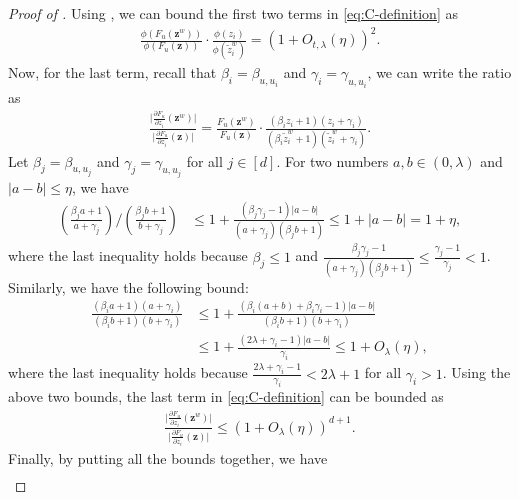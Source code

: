 \documentclass[11pt]{amsart}
\newcommand{\tp}[1]{{\left( #1 \right)}}
\theoremstyle{definition}
\theoremstyle{remark}
\begin{document}
\begin{proof}[Proof of ]
Using , we can bound the first two terms in \eqref{eq:C-definition} as
\begin{align*}
    \frac{\phi(F_u(\boldsymbol{z}^w))}{\phi(F_u(\boldsymbol{z}))} \cdot \frac{\phi(z_i)}{\phi(\tilde{z}_i^w)}  = \tp{1 + O_{t,\lambda} (\eta)}^2.
\end{align*}
Now, for the last term, recall that $\beta_i = \beta_{u,u_i}$ and $\gamma_i = \gamma_{u,u_i}$, we can write the ratio as 
\begin{align*}
    \frac{\bigl| \frac{\partial F_u}{\partial z_i}(\boldsymbol{z}^w) \bigr|}{\bigl| \frac{\partial F_u}{\partial z_i}(\boldsymbol{z}) \bigr|} = \frac{F_u(\boldsymbol{z}^w)}{F_u(\boldsymbol{z})} \cdot \frac{(\beta_i z_i + 1)(z_i + \gamma_i)}{(\beta_i \tilde{z}_i^w + 1)(\tilde{z}_i^w + \gamma_i)}.
\end{align*}
Let $\beta_j = \beta_{u,u_j}$ and $\gamma_j = \gamma_{u,u_j}$ for all $j \in [d]$. For two numbers $a,b \in (0,\lambda)$ and $|a-b| \leq \eta$, we have
\begin{align*}
\tp{\frac{\beta_j a + 1}{a + \gamma_j}} / \tp{\frac{\beta_j b + 1}{b + \gamma_j}} &\leq 1 + \frac{(\beta_j \gamma_j - 1) |a - b|}{(a + \gamma_j)(\beta_j b + 1)} \leq  1 + |a - b| = 1 + \eta,
\end{align*}
where the last inequality holds because $\beta_j \leq 1$ and $\frac{\beta_j \gamma_j - 1}{(a + \gamma_j)(\beta_j b + 1)} \leq \frac{\gamma_j-1}{\gamma_j} < 1$.  
Similarly, we have the following bound:
\begin{align*}
\frac{(\beta_i a + 1)(a+\gamma_i)}{(\beta_i b + 1)(b+\gamma_i)} &\leq 1 + \frac{(\beta_i (a+b) + \beta_i \gamma_i - 1)|a-b|}{(\beta_i b + 1)(b+\gamma_i)}\\
& \leq 1+\frac{(2\lambda + \gamma_i - 1)|a-b|}{\gamma_i}\leq 1 +O_{\lambda} (\eta),
\end{align*}
where the last inequality holds because $\frac{2\lambda + \gamma_i - 1}{\gamma_i} < 2\lambda + 1$ for all $\gamma_i > 1$.
Using the above two bounds, the last term in \eqref{eq:C-definition} can be bounded as
\begin{align*}
    \frac{\bigl| \frac{\partial F_u}{\partial z_i}(\boldsymbol{z}^w) \bigr|}{\bigl| \frac{\partial F_u}{\partial z_i}(\boldsymbol{z}) \bigr|} \leq \tp{1 + O_{\lambda} (\eta)}^{d+1}.
\end{align*}
Finally, by putting all the bounds together, we have
\begin{align*}

\end{align*}
\end{proof}
\end{document}
